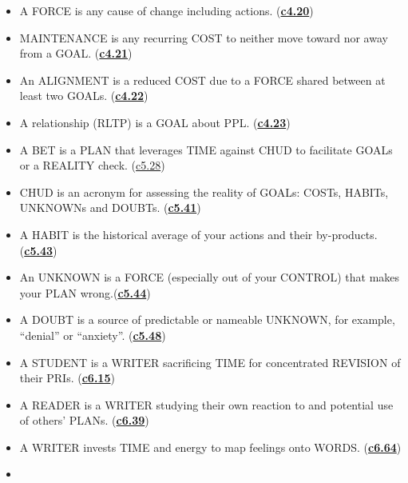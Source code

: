 \documentclass[
]{book}
\begin{document}
\begin{itemize}
\item
  A FORCE is any cause of change including actions. (\protect\hyperlink{work}{\textbf{c4.20}})\\
\item
  MAINTENANCE is any recurring COST to neither move toward nor away from a GOAL. (\protect\hyperlink{work}{\textbf{c4.21}})\\
\item
  An ALIGNMENT is a reduced COST due to a FORCE shared between at least two GOALs. (\protect\hyperlink{work}{\textbf{c4.22}})\\
\item
  A relationship (RLTP) is a GOAL about PPL. (\protect\hyperlink{work}{\textbf{c4.23}})\\
\item
  A BET is a PLAN that leverages TIME against CHUD to facilitate GOALs or a REALITY check. (\protect\hyperlink{bet}{c5.28})\\
\item
  CHUD is an acronym for assessing the reality of GOALs: COSTs, HABITs, UNKNOWNs and DOUBTs. (\protect\hyperlink{c.h.u.d.}{\textbf{c5.41}})\\
\item
  A HABIT is the historical average of your actions and their by-products.(\protect\hyperlink{costs-and-habits}{\textbf{c5.43}})\\
\item
  An UNKNOWN is a FORCE (especially out of your CONTROL) that makes your PLAN wrong.(\protect\hyperlink{unknowns-and-doubts}{\textbf{c5.44}})\\
\item
  A DOUBT is a source of predictable or nameable UNKNOWN, for example, ``denial'' or ``anxiety''. (\protect\hyperlink{unknowns-and-doubts}{\textbf{c5.48}})\\
\item
  A STUDENT is a WRITER sacrificing TIME for concentrated REVISION of their PRIs. (\protect\hyperlink{student}{\textbf{c6.15}})\\
\item
  A READER is a WRITER studying their own reaction to and potential use of others' PLANs. (\protect\hyperlink{read}{\textbf{c6.39}})\\
\item
  A WRITER invests TIME and energy to map feelings onto WORDS. (\protect\hyperlink{write-plan-1}{\textbf{c6.64}})\\
\item

\end{itemize}
\end{document}

